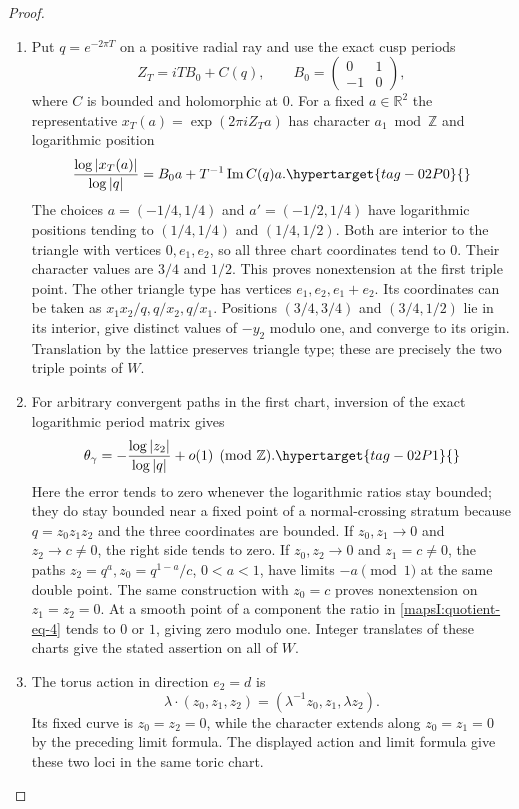 \begin{proof}
\begin{enumerate}[label=\arabic*.,leftmargin=*]
\item Put $q=e^{-2\pi T}$ on a positive radial ray and use the exact
cusp periods
\[
 Z_T=iTB_0+C(q),\qquad
 B_0=\begin{pmatrix}0&1\\-1&0\end{pmatrix},
\]
where $C$ is bounded and holomorphic at $0$.  For a fixed
$a\in\mathbb R^2$ the representative
$x_T(a)=\exp(2\pi iZ_Ta)$ has character $a_1\bmod\mathbb Z$ and
logarithmic position
\[
 \frac{\log|x_T(a)|}{\log|q|}
 =B_0a+T^{-1}\operatorname{Im}C(q)a.
 \hypertarget{tag-02P0}{}\label{mapsI:quotient-eq-3}
\]
The choices $a=(-1/4,1/4)$ and $a'=(-1/2,1/4)$ have logarithmic
positions tending to $(1/4,1/4)$ and $(1/4,1/2)$.
Both are interior to the triangle with vertices $0,e_1,e_2$,
so all three chart coordinates tend to $0$.  Their character
values are $3/4$ and $1/2$.  This proves nonextension at the
first triple point.  The other triangle type has vertices
$e_1,e_2,e_1+e_2$.  Its coordinates can be taken as
$x_1x_2/q,q/x_2,q/x_1$.  Positions $(3/4,3/4)$ and
$(3/4,1/2)$ lie in its interior, give distinct values of $-y_2$
modulo one, and converge to its origin.  Translation by the
lattice preserves triangle type; these are precisely the two
triple points of $W$.

\item For arbitrary convergent paths in the first chart, inversion
of the exact logarithmic period matrix gives
\[
 \theta_\gamma=-\frac{\log|z_2|}{\log|q|}+o(1)\pmod{\mathbb Z}.
 \hypertarget{tag-02P1}{}\label{mapsI:quotient-eq-4}
\]
Here the error tends to zero whenever the logarithmic ratios
stay bounded; they do stay bounded near a fixed point of a
normal-crossing stratum because $q=z_0z_1z_2$ and the three
coordinates are bounded.  If $z_0,z_1\to0$ and $z_2\to c\ne0$,
the right side tends to zero.  If $z_0,z_2\to0$ and $z_1=c\ne0$,
the paths $z_2=q^a,z_0=q^{1-a}/c$, $0<a<1$, have limits
$-a\pmod1$ at the same double point.  The same construction
with $z_0=c$ proves nonextension on $z_1=z_2=0$.
At a smooth point of a component the ratio in \eqref{mapsI:quotient-eq-4} tends
to $0$ or $1$, giving zero modulo one.  Integer translates
of these charts give the stated assertion on all of $W$.

\item The torus action in direction $e_2=d$ is
\[
 \lambda\cdot(z_0,z_1,z_2)
       =(\lambda^{-1}z_0,z_1,\lambda z_2).
\]
Its fixed curve is $z_0=z_2=0$, while the character extends along
$z_0=z_1=0$ by the preceding limit formula. The displayed action and
limit formula give these two loci in the same toric chart.
\end{enumerate}
\end{proof}

